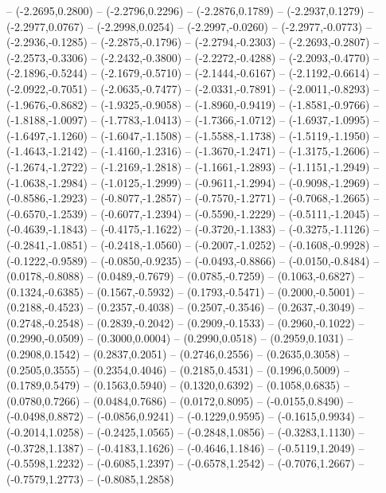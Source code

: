 {	-- (-2.2695,0.2800)
	-- (-2.2796,0.2296)
	-- (-2.2876,0.1789)
	-- (-2.2937,0.1279)
	-- (-2.2977,0.0767)
	-- (-2.2998,0.0254)
	-- (-2.2997,-0.0260)
	-- (-2.2977,-0.0773)
	-- (-2.2936,-0.1285)
	-- (-2.2875,-0.1796)
	-- (-2.2794,-0.2303)
	-- (-2.2693,-0.2807)
	-- (-2.2573,-0.3306)
	-- (-2.2432,-0.3800)
	-- (-2.2272,-0.4288)
	-- (-2.2093,-0.4770)
	-- (-2.1896,-0.5244)
	-- (-2.1679,-0.5710)
	-- (-2.1444,-0.6167)
	-- (-2.1192,-0.6614)
	-- (-2.0922,-0.7051)
	-- (-2.0635,-0.7477)
	-- (-2.0331,-0.7891)
	-- (-2.0011,-0.8293)
	-- (-1.9676,-0.8682)
	-- (-1.9325,-0.9058)
	-- (-1.8960,-0.9419)
	-- (-1.8581,-0.9766)
	-- (-1.8188,-1.0097)
	-- (-1.7783,-1.0413)
	-- (-1.7366,-1.0712)
	-- (-1.6937,-1.0995)
	-- (-1.6497,-1.1260)
	-- (-1.6047,-1.1508)
	-- (-1.5588,-1.1738)
	-- (-1.5119,-1.1950)
	-- (-1.4643,-1.2142)
	-- (-1.4160,-1.2316)
	-- (-1.3670,-1.2471)
	-- (-1.3175,-1.2606)
	-- (-1.2674,-1.2722)
	-- (-1.2169,-1.2818)
	-- (-1.1661,-1.2893)
	-- (-1.1151,-1.2949)
	-- (-1.0638,-1.2984)
	-- (-1.0125,-1.2999)
	-- (-0.9611,-1.2994)
	-- (-0.9098,-1.2969)
	-- (-0.8586,-1.2923)
	-- (-0.8077,-1.2857)
	-- (-0.7570,-1.2771)
	-- (-0.7068,-1.2665)
	-- (-0.6570,-1.2539)
	-- (-0.6077,-1.2394)
	-- (-0.5590,-1.2229)
	-- (-0.5111,-1.2045)
	-- (-0.4639,-1.1843)
	-- (-0.4175,-1.1622)
	-- (-0.3720,-1.1383)
	-- (-0.3275,-1.1126)
	-- (-0.2841,-1.0851)
	-- (-0.2418,-1.0560)
	-- (-0.2007,-1.0252)
	-- (-0.1608,-0.9928)
	-- (-0.1222,-0.9589)
	-- (-0.0850,-0.9235)
	-- (-0.0493,-0.8866)
	-- (-0.0150,-0.8484)
	-- (0.0178,-0.8088)
	-- (0.0489,-0.7679)
	-- (0.0785,-0.7259)
	-- (0.1063,-0.6827)
	-- (0.1324,-0.6385)
	-- (0.1567,-0.5932)
	-- (0.1793,-0.5471)
	-- (0.2000,-0.5001)
	-- (0.2188,-0.4523)
	-- (0.2357,-0.4038)
	-- (0.2507,-0.3546)
	-- (0.2637,-0.3049)
	-- (0.2748,-0.2548)
	-- (0.2839,-0.2042)
	-- (0.2909,-0.1533)
	-- (0.2960,-0.1022)
	-- (0.2990,-0.0509)
	-- (0.3000,0.0004)
	-- (0.2990,0.0518)
	-- (0.2959,0.1031)
	-- (0.2908,0.1542)
	-- (0.2837,0.2051)
	-- (0.2746,0.2556)
	-- (0.2635,0.3058)
	-- (0.2505,0.3555)
	-- (0.2354,0.4046)
	-- (0.2185,0.4531)
	-- (0.1996,0.5009)
	-- (0.1789,0.5479)
	-- (0.1563,0.5940)
	-- (0.1320,0.6392)
	-- (0.1058,0.6835)
	-- (0.0780,0.7266)
	-- (0.0484,0.7686)
	-- (0.0172,0.8095)
	-- (-0.0155,0.8490)
	-- (-0.0498,0.8872)
	-- (-0.0856,0.9241)
	-- (-0.1229,0.9595)
	-- (-0.1615,0.9934)
	-- (-0.2014,1.0258)
	-- (-0.2425,1.0565)
	-- (-0.2848,1.0856)
	-- (-0.3283,1.1130)
	-- (-0.3728,1.1387)
	-- (-0.4183,1.1626)
	-- (-0.4646,1.1846)
	-- (-0.5119,1.2049)
	-- (-0.5598,1.2232)
	-- (-0.6085,1.2397)
	-- (-0.6578,1.2542)
	-- (-0.7076,1.2667)
	-- (-0.7579,1.2773)
	-- (-0.8085,1.2858)
}

